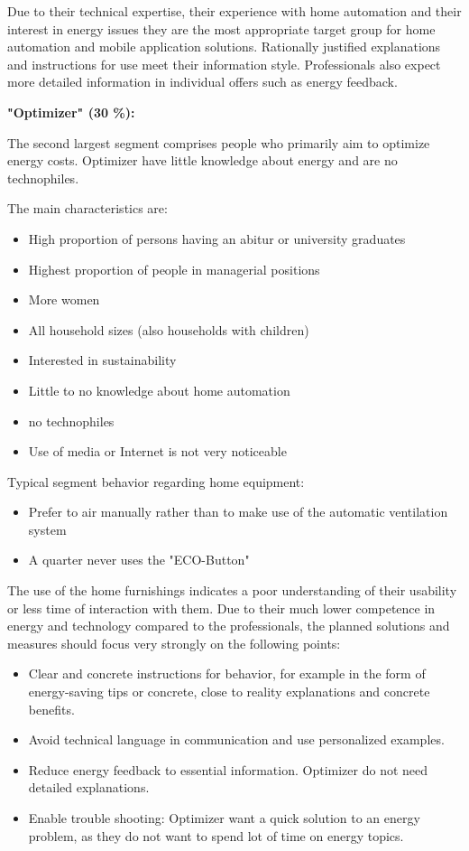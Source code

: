 Due to their technical expertise, their experience with home automation and their interest in energy issues they are the most appropriate target group for home automation and mobile application solutions. Rationally justified explanations and instructions for use meet their information style. Professionals also expect more detailed information in individual offers such as energy feedback.

\textbf{"Optimizer" (30 \%):}

The second largest segment comprises people who primarily aim to optimize energy costs. Optimizer have little knowledge about energy and are no technophiles.

The main characteristics are:
\begin{itemize}
	\item High proportion of persons having an abitur or university graduates
	\item Highest proportion of people in managerial positions
	\item More women
	\item All household sizes (also households with children)
	\item Interested in sustainability	
	\item Little to no knowledge about home automation
	\item no technophiles
	\item Use of media or Internet is not very noticeable
\end{itemize}

Typical segment behavior regarding home equipment:
\begin{itemize}
	\item Prefer to air manually rather than to make use of the automatic ventilation system
	\item A quarter never uses the "ECO-Button"
\end{itemize}

The use of the home furnishings indicates a poor understanding of their usability or less time of interaction with them. Due to their much lower competence in energy and technology compared to the professionals, the planned solutions and measures should focus very strongly on the following points:

\begin{itemize}
	\item Clear and concrete instructions for behavior, for example in the form of energy-saving tips or concrete, close to reality explanations and concrete benefits.
	\item Avoid technical language in communication and use personalized examples.
	\item Reduce energy feedback to essential information. Optimizer do not need detailed explanations. 
	\item Enable trouble shooting: Optimizer want a quick solution to an energy problem, as they do not want to spend lot of time on energy topics.
\end{itemize}

